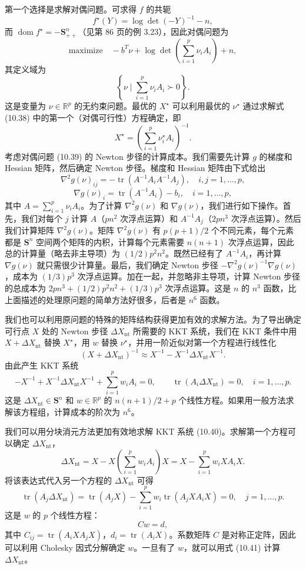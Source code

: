 \documentclass[UTF8,12pt,a4paper,fontset=fandol]{ctexart}
\begin{document}
第一个选择是求解对偶问题。可求得 $f$ 的共轭
\[
f^\star(Y)=\log\det(-Y)^{-1}-n,
\]
而 $\operatorname{dom} f^\star=-\mathbf{S}_{++}^n$（见第 86 页的例 3.23），因此对偶问题为
\begin{equation}
\mbox{maximize}\quad -b^T\nu+\log\det\left(\sum_{i=1}^p\nu_iA_i\right)+n,
\tag{10.39}
\end{equation}
其定义域为
\[
\left\{\nu\mid \sum_{i=1}^p\nu_iA_i\succ0\right\}.
\]
这是变量为 $\nu\in\mathbb{R}^p$ 的无约束问题。最优的 $X^\star$ 可以利用最优的 $\nu^\star$ 通过求解式 (10.38) 中的第一个（对偶可行性）方程确定，即
\[
X^\star=\left(\sum_{i=1}^p\nu_i^\star A_i\right)^{-1}.
\]
考虑对偶问题 (10.39) 的 Newton 步径的计算成本。我们需要先计算 $g$ 的梯度和 Hessian 矩阵，然后确定 Newton 步径。梯度和 Hessian 矩阵由下式给出
\[
\nabla^2g(\nu)_{ij}=-\operatorname{tr}(A^{-1}A_iA^{-1}A_j),\quad i,j=1,\ldots,p,
\]
\[
\nabla g(\nu)_i=\operatorname{tr}(A^{-1}A_i)-b_i,\quad i=1,\ldots,p,
\]
其中 $A=\sum_{i=1}^p\nu_iA_i$。为了计算 $\nabla^2g(\nu)$ 和 $\nabla g(\nu)$，我们进行如下操作。首先，我们对每个 $j$ 计算 $A$（$pn^2$ 次浮点运算）和 $A^{-1}A_j$（$2pn^3$ 次浮点运算）。然后我们计算矩阵 $\nabla^2g(\nu)$。矩阵 $\nabla^2g(\nu)$ 有 $p(p+1)/2$ 个不同元素，每个元素都是 $\mathbf{S}^n$ 空间两个矩阵的内积，计算每个元素需要 $n(n+1)$ 次浮点运算，因此总的计算量（略去非主导项）为 $(1/2)p^2n^2$。既然已经有了 $A^{-1}A_i$，再计算 $\nabla g(\nu)$ 就只需很少计算量。最后，我们确定 Newton 步径 $-\nabla^2g(\nu)^{-1}\nabla g(\nu)$，成本为 $(1/3)p^3$ 次浮点运算。加在一起，并忽略非主导项，计算 Newton 步径的总成本为 $2pn^3+(1/2)p^2n^2+(1/3)p^3$ 次浮点运算。这是 $n$ 的 $n^3$ 函数，比上面描述的处理原问题的简单方法好很多，后者是 $n^6$ 函数。

我们也可以利用原问题的特殊的矩阵结构获得更加有效的求解方法。为了导出确定可行点 $X$ 处的 Newton 步径 $\Delta X_{\mathrm{nt}}$ 所需要的 KKT 系统，我们在 KKT 条件中用 $X+\Delta X_{\mathrm{nt}}$ 替换 $X^\star$，用 $w$ 替换 $\nu^\star$，并用一阶近似对第一个方程进行线性化
\[
(X+\Delta X_{\mathrm{nt}})^{-1}\approx X^{-1}-X^{-1}\Delta X_{\mathrm{nt}}X^{-1}.
\]
由此产生 KKT 系统
\begin{equation}
-X^{-1}+X^{-1}\Delta X_{\mathrm{nt}}X^{-1}
+\sum_{i=1}^p w_iA_i=0,\qquad
\operatorname{tr}(A_i\Delta X_{\mathrm{nt}})=0,\quad i=1,\ldots,p.
\tag{10.40}
\end{equation}
这是 $\Delta X_{\mathrm{nt}}\in\mathbf{S}^n$ 和 $w\in\mathbb{R}^p$ 的 $n(n+1)/2+p$ 个线性方程。如果用一般方法求解该方程组，计算成本的阶次为 $n^6$。

我们可以用分块消元方法更加有效地求解 KKT 系统 (10.40)。求解第一个方程可以确定 $\Delta X_{\mathrm{nt}}$，
\begin{equation}
\Delta X_{\mathrm{nt}}
=X-X\left(\sum_{i=1}^p w_iA_i\right)X
=X-\sum_{i=1}^p w_iXA_iX.
\tag{10.41}
\end{equation}
将该表达式代入另一个方程的 $\Delta X_{\mathrm{nt}}$ 可得
\[
\operatorname{tr}(A_j\Delta X_{\mathrm{nt}})
=\operatorname{tr}(A_jX)-\sum_{i=1}^p w_i\operatorname{tr}(A_jXA_iX)=0,\quad j=1,\ldots,p.
\]
这是 $w$ 的 $p$ 个线性方程：
\[
Cw=d,
\]
其中 $C_{ij}=\operatorname{tr}(A_iXA_jX)$，$d_i=\operatorname{tr}(A_iX)$。系数矩阵 $C$ 是对称正定阵，因此可以利用 Cholesky 因式分解确定 $w$。一旦有了 $w$，就可以用式 (10.41) 计算 $\Delta X_{\mathrm{nt}}$。
\end{document}
